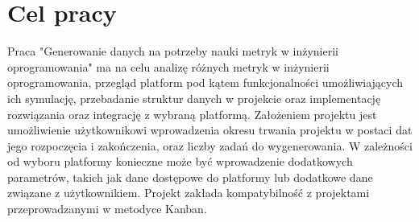 \section*{Cel pracy}
Praca "Generowanie danych na potrzeby nauki metryk w inżynierii oprogramowania" ma na celu analizę różnych metryk w inżynierii oprogramowania, przegląd platform pod kątem funkcjonalności umożliwiających
ich symulację, przebadanie struktur danych w projekcie oraz implementację rozwiązania oraz integrację z wybraną platformą.
Założeniem projektu jest umożliwienie użytkownikowi wprowadzenia okresu trwania projektu w postaci dat jego rozpoczęcia i zakończenia, oraz liczby zadań do wygenerowania.
W zależności od wyboru platformy konieczne może być wprowadzenie dodatkowych parametrów, takich jak dane dostępowe do platformy lub dodatkowe dane związane z użytkownikiem.
Projekt zakłada kompatybilność z projektami przeprowadzanymi w metodyce Kanban.
